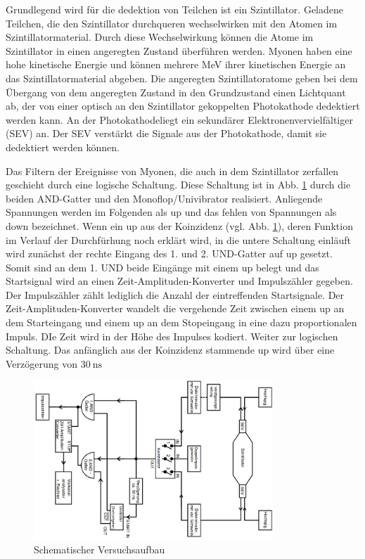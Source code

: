 Grundlegend wird für die dedektion von Teilchen ist ein Szintillator.
Geladene Teilchen, die den Szintillator durchqueren wechselwirken mit den Atomen
im Szintillatormaterial. Durch diese Wechselwirkung können
die Atome im Szintillator in einen angeregten Zustand überführen werden.
Myonen haben eine hohe kinetische Energie und können mehrere MeV ihrer kinetischen Energie
an das Szintillatormaterial abgeben. Die angeregten Szintillatoratome geben
bei dem Übergang von dem angeregten Zustand in den Grundzustand einen Lichtquant
ab, der von einer optisch an den Szintillator gekoppelten Photokathode
dedektiert werden kann.
An der Photokathodeliegt ein sekundärer Elektronenvervielfältiger (SEV) an.
Der SEV verstärkt die Signale aus der Photokathode, damit sie dedektiert werden
können.

Das Filtern der Ereignisse von Myonen, die auch in dem Szintillator zerfallen
geschieht durch eine logische Schaltung. Diese Schaltung ist in Abb. \ref{fig:Aufbau}
durch die beiden AND-Gatter und den Monoflop/Univibrator realisiert.
Anliegende Spannungen werden im Folgenden als up und das fehlen von Spannungen
als down bezeichnet.
Wenn ein up aus der Koinzidenz (vgl. Abb. \ref{fig:Aufbau}), deren Funktion im
Verlauf der Durchfürhung noch erklärt wird, in die untere Schaltung einläuft
wird zunächst der rechte Eingang des 1. und 2. UND-Gatter auf up gesetzt.
Somit sind an dem 1. UND beide Eingänge mit einem up belegt und das Startsignal wird
an einen Zeit-Amplituden-Konverter und Impulszähler gegeben. Der Impulszähler
zählt lediglich die Anzahl der eintreffenden Startsignale.
Der Zeit-Amplituden-Konverter wandelt die vergehende Zeit zwischen einem
up an dem Starteingang und einem up an dem Stopeingang in eine
dazu proportionalen Impuls. DIe Zeit wird in der Höhe des Impulses
kodiert.
Weiter zur logischen Schaltung. Das anfänglich aus der Koinzidenz stammende
up wird über eine Verzögerung von $\SI{30}{\nano\second}$   


\begin{figure}[h]
  \centering
  \includegraphics[width=9cm, angle=90]{Pics/Aufbau.png}
  \caption{Schematischer Versuchsaufbau \cite{anleitung01}}
  \label{fig:Aufbau}
\end{figure}

